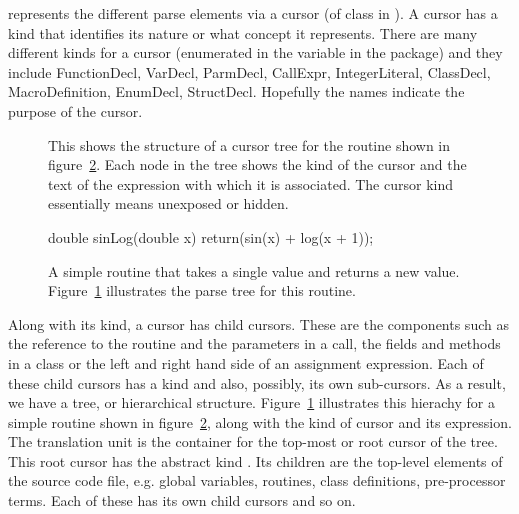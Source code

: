 \libclang{} represents the different parse elements 
via a cursor (of
class  in \R).  A cursor has a kind that identifies
its nature or what concept it represents. There are many different
kinds for a cursor (enumerated in the variable  in
the  package) and they include FunctionDecl, VarDecl,
ParmDecl, CallExpr, IntegerLiteral, ClassDecl, MacroDefinition,
EnumDecl, StructDecl.  Hopefully the names indicate the purpose of the
cursor.

\begin{figure}
  
\cprotect\caption{This shows the structure of a cursor tree for the 
\C{} routine  shown in figure~\ref{fig:sinLogRoutine}.
Each node in the tree shows the kind of the cursor
and the text of the expression with which it is associated.
The cursor kind  essentially means unexposed or hidden.
}
\label{fig:sinLogTree}  
\end{figure}

\begin{figure}
\centering
\begin{CCode}
              double
              sinLog(double x)
              {
                 return(sin(x) + log(x + 1));
              }
\end{CCode}  

\caption{A simple routine that takes a single  value
and returns a new value. Figure~\ref{fig:sinLogTree} illustrates the
parse tree for this routine.}\label{fig:sinLogRoutine}
\end{figure}


Along with its kind, a cursor has child cursors.  These are the
components such as the reference to the routine and the parameters in
a call, the fields and methods in a \Cpp{} class or the left and right
hand side of an assignment expression. Each of these child cursors has
a kind and also, possibly, its own sub-cursors. As a result, we have a
tree, or hierarchical structure.  Figure~\ref{fig:sinLogTree}
illustrates this hierachy for a simple routine shown in
figure~\ref{fig:sinLogRoutine}, along with the kind of cursor and 
its expression.  The translation unit is the
container for the top-most or root cursor of the tree.  This root
cursor has the abstract kind .  Its
children are the top-level elements of the source code file,
e.g. global variables, routines, class definitions, pre-processor
terms. Each of these has its own child cursors and so on.

